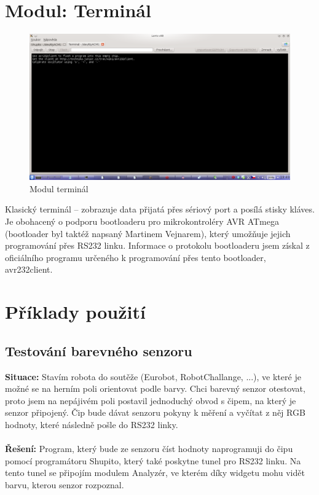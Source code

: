 \documentclass[12pt, a4paper, oneside]{article}
\begin{document}
\section{Modul: Terminál}

\begin{figure}[h]
\begin{center}
\includegraphics[width=\textwidth]{img/terminal.png}
\caption{Modul terminál}
\label{Terminal}
\end{center}
\end{figure}

Klasický terminál -- zobrazuje data přijatá přes sériový port a posílá stisky kláves. Je obohacený o podporu bootloaderu pro mikrokontroléry AVR ATmega (bootloader byl taktéž napsaný Martinem Vejnarem), který umožňuje jejich programování přes RS232 linku. Informace o protokolu bootloaderu jsem získal z oficiálního programu určeného k programování přes tento bootloader, avr232client.


\newpage
\section{Příklady použití}
\subsection{Testování barevného senzoru}
{\bf Situace:} Stavím robota do soutěže (Eurobot, RobotChallange, ...), ve které je možné se na herním poli orientovat podle barvy. Chci barevný senzor otestovat, proto jsem na nepájivém poli postavil jednoduchý obvod s čipem, na který je senzor připojený. Čip bude dávat senzoru pokyny k měření a vyčítat z něj RGB hodnoty, které následně pošle do RS232 linky.\\
\\
{\bf Řešení:} Program, který bude ze senzoru číst hodnoty naprogramuji do čipu pomocí programátoru Shupito, který také poskytne tunel pro RS232 linku. Na tento tunel se připojím modulem Analyzér, ve kterém díky widgetu  mohu vidět barvu, kterou senzor rozpoznal.
\end{document}
